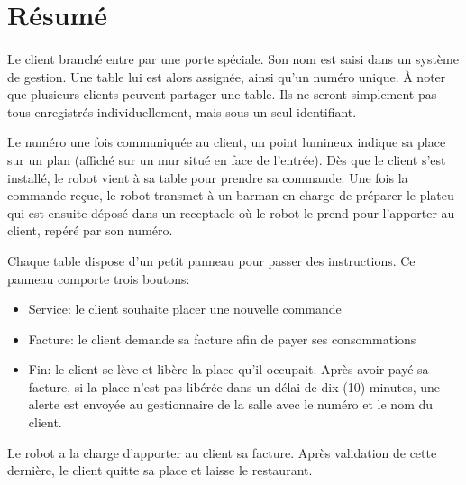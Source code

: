 \section*{Résumé}
\paragraph{}
Le client branché entre par une porte spéciale. Son 
nom est saisi dans un système de gestion. Une table 
lui est alors assignée, ainsi qu'un numéro unique.
À noter que plusieurs clients peuvent partager une 
table. Ils ne seront simplement pas tous enregistrés 
individuellement, mais sous un seul identifiant. \par 
Le numéro une fois communiquée au client, un point 
lumineux indique sa place sur un plan (affiché sur un 
mur situé en face de l'entrée). Dès que le client 
s'est installé, le robot vient à sa table pour prendre
sa commande. Une fois la commande reçue, le robot 
transmet à un barman en charge de préparer le plateu
qui est ensuite déposé dans un receptacle où le robot 
le prend pour l'apporter au client, repéré par son numéro. \par 
Chaque table dispose d'un petit panneau pour passer
des instructions. Ce panneau comporte trois boutons:
\par 
\begin{itemize}
    \item Service: le client souhaite placer une nouvelle commande
    \item Facture: le client demande sa facture afin de payer ses consommations
    \item Fin: le client se lève et libère la place qu'il occupait.
    Après avoir payé sa facture, si la place n'est pas 
    libérée dans un délai de dix (10) minutes, une alerte
    est envoyée au gestionnaire de la salle avec le 
    numéro et le nom du client.
\end{itemize}
\par
Le robot a la charge d'apporter au client sa facture. Après validation de cette dernière, le client quitte sa
place et laisse le restaurant.
\par 

